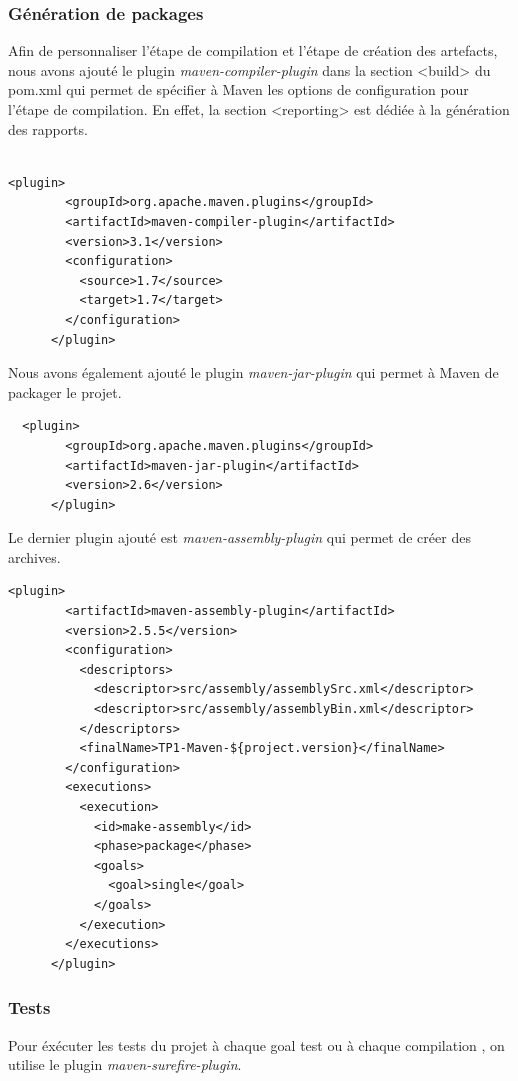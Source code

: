\documentclass{article}
\begin{document}
\subsubsection{Génération de packages}
Afin de personnaliser l'étape de compilation et l'étape de création des artefacts, nous avons ajouté le plugin \textit{maven-compiler-plugin} dans la section <build> du pom.xml qui permet de spécifier à Maven les options de configuration pour l'étape de compilation. En effet, la section <reporting> est dédiée à la génération des rapports. \\\\
\begin{verbatim}
<plugin>
        <groupId>org.apache.maven.plugins</groupId>
        <artifactId>maven-compiler-plugin</artifactId>
        <version>3.1</version>
        <configuration>
          <source>1.7</source>
          <target>1.7</target>
        </configuration>
      </plugin>
\end{verbatim}
Nous avons également ajouté le plugin \textit{maven-jar-plugin} qui permet à Maven de packager le projet.\\
\begin{verbatim}
  <plugin>
        <groupId>org.apache.maven.plugins</groupId>
        <artifactId>maven-jar-plugin</artifactId>
        <version>2.6</version>
      </plugin>
\end{verbatim}
Le dernier plugin ajouté est \textit{maven-assembly-plugin} qui permet de créer des archives.
\begin{verbatim}
<plugin>
        <artifactId>maven-assembly-plugin</artifactId>
        <version>2.5.5</version>
        <configuration>
          <descriptors>
            <descriptor>src/assembly/assemblySrc.xml</descriptor>
            <descriptor>src/assembly/assemblyBin.xml</descriptor>
          </descriptors>
          <finalName>TP1-Maven-${project.version}</finalName>
        </configuration>
        <executions>
          <execution>
            <id>make-assembly</id>
            <phase>package</phase>
            <goals>
              <goal>single</goal>
            </goals>
          </execution>
        </executions>
      </plugin>
\end{verbatim}
\subsubsection{Tests}
Pour éxécuter les tests du projet à chaque goal test ou à chaque compilation , on utilise le plugin
\textit{maven-surefire-plugin}.
\end{document}
